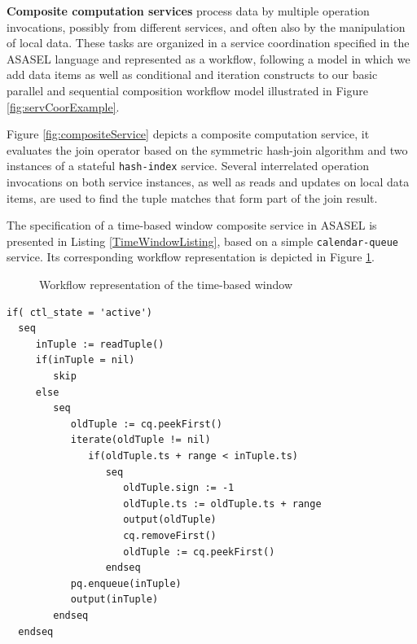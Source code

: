 \textbf{Composite computation services}  process data by multiple operation invocations, possibly from different services, and often also by the manipulation of local data. These tasks are organized in a service coordination specified in the ASASEL language and represented as a workflow, following a model in which we add data items as well as conditional and iteration constructs to our basic parallel and sequential composition workflow model illustrated in Figure \ref{fig:servCoorExample}.
		
Figure \ref{fig:compositeService} depicts a composite computation service, it evaluates the join operator based on the symmetric hash-join algorithm and two instances of a stateful \texttt{hash-index} service. Several interrelated operation invocations on both service instances, as well as reads and updates on local data items, are used to find the tuple matches that form part of the join result.

The specification of a time-based window composite service in ASASEL is presented in Listing \ref{TimeWindowListing}, based on a simple \texttt{calendar-queue} service. Its corresponding workflow representation is depicted in Figure \ref{fig:timeBasedWindowWF}.

	\begin{figure}
   \begin{center}
   \end{center}
   \caption{Workflow representation of the time-based window}
   \label{fig:timeBasedWindowWF}
\end{figure}
		
\lstset{language=AbStM,showstringspaces=false}
\begin{lstlisting}[caption={ASM specification for the time-based window},label=TimeWindowListing]
if( ctl_state = 'active')
  seq
     inTuple := readTuple()
     if(inTuple = nil)
        skip
     else
        seq
           oldTuple := cq.peekFirst()
           iterate(oldTuple != nil)
              if(oldTuple.ts + range < inTuple.ts)
                 seq
                    oldTuple.sign := -1
                    oldTuple.ts := oldTuple.ts + range
                    output(oldTuple)
                    cq.removeFirst()
                    oldTuple := cq.peekFirst()
                 endseq
           pq.enqueue(inTuple)
           output(inTuple)
        endseq
  endseq
\end{lstlisting}

